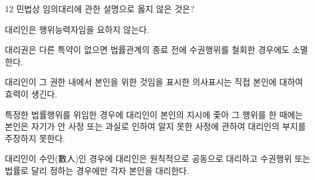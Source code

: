 \begin{question}{12}
민법상 임의대리에 관한 설명으로 옳지 않은 것은?
\begin{choices}
  \item 대리인은 행위능력자임을 요하지 않는다.
  \item 대리권은 다른 특약이 없으면 법률관계의 종료 전에 수권행위를 철회한 경우에도 소멸한다.
  \item 대리인이 그 권한 내에서 본인을 위한 것임을 표시한 의사표시는 직접 본인에 대하여 효력이 생긴다.
  \item 특정한 법률행위를 위임한 경우에 대리인이 본인의 지시에 좇아 그 행위를 한 때에는 본인은 자기가 안 사정 또는 과실로 인하여 알지 못한 사정에 관하여 대리인의 부지를 주장하지 못한다.
  \item 대리인이 수인(數人)인 경우에 대리인은 원칙적으로 공동으로 대리하고 수권행위 또는 법률로 달리 정하는 경우에만 각자 본인을 대리한다.
\end{choices}
\end{question}
